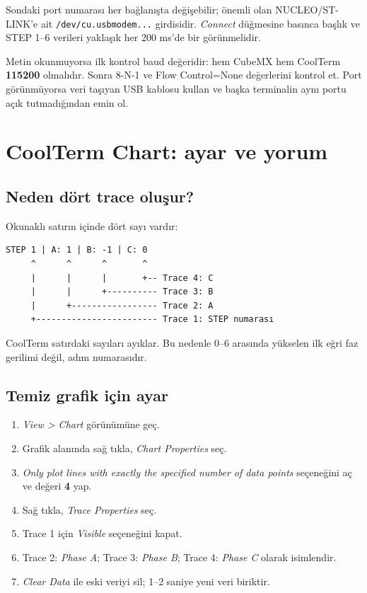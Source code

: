 \documentclass[11pt,a4paper]{article}
\begin{document}
Sondaki port numarası her bağlanışta değişebilir; önemli olan NUCLEO/ST-LINK'e
ait \texttt{/dev/cu.\allowbreak usbmodem...} girdisidir. \textit{Connect} düğmesine basınca
başlık ve STEP 1--6 verileri yaklaşık her 200 ms'de bir görünmelidir.

Metin okunmuyorsa ilk kontrol baud değeridir: hem CubeMX hem CoolTerm
\textbf{115200} olmalıdır. Sonra 8-N-1 ve Flow Control=None değerlerini kontrol
et. Port görünmüyorsa veri taşıyan USB kablosu kullan ve başka terminalin aynı
portu açık tutmadığından emin ol.

\section{CoolTerm Chart: ayar ve yorum}

\subsection{Neden dört trace oluşur?}

Okunaklı satırın içinde dört sayı vardır:

\begin{lstlisting}
STEP 1 | A: 1 | B: -1 | C: 0
     ^      ^      ^       ^
     |      |      |       +-- Trace 4: C
     |      |      +---------- Trace 3: B
     |      +----------------- Trace 2: A
     +------------------------ Trace 1: STEP numarası
\end{lstlisting}

CoolTerm satırdaki sayıları ayıklar. Bu nedenle 0--6 arasında yükselen ilk eğri
faz gerilimi değil, adım numarasıdır.

\subsection{Temiz grafik için ayar}

\begin{enumerate}
  \item \textit{View > Chart} görünümüne geç.
  \item Grafik alanında sağ tıkla, \textit{Chart Properties} seç.
  \item \textit{Only plot lines with exactly the specified number of data points}
        seçeneğini aç ve değeri \textbf{4} yap.
  \item Sağ tıkla, \textit{Trace Properties} seç.
  \item Trace 1 için \textit{Visible} seçeneğini kapat.
  \item Trace 2: \textit{Phase A}; Trace 3: \textit{Phase B}; Trace 4:
        \textit{Phase C} olarak isimlendir.
  \item \textit{Clear Data} ile eski veriyi sil; 1--2 saniye yeni veri biriktir.
\end{enumerate}
\end{document}
